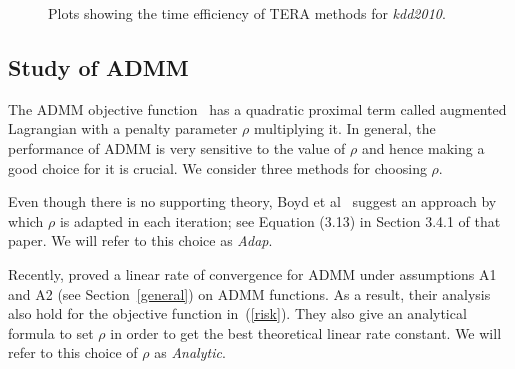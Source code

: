 \documentclass[twoside, 11pt]{article}
\begin{document}
\begin{figure}[t]
\centering
{}
\caption{Plots showing the time efficiency of TERA methods for {\it kdd2010}.}
\label{fig:tera}
\end{figure}


\subsection{Study of ADMM}
\label{subsec:admm}

The ADMM objective function~\citep{Boyd2011} has a quadratic proximal term called augmented Lagrangian with a penalty parameter $\rho$ multiplying it. In general, the performance of ADMM is very sensitive to the value of $\rho$ and hence making a good choice for it is crucial. We consider three methods for choosing $\rho$.

Even though there is no supporting theory, Boyd et al~\citep{Boyd2011} suggest an approach by which $\rho$ is adapted in each iteration; see Equation (3.13) in Section 3.4.1 of that paper. We will refer to this choice as {\it Adap}.

Recently, \citet{deng2012} proved a linear rate of convergence for ADMM under assumptions A1 and A2 (see Section~\ref{general}) on ADMM functions. As a result, their analysis also hold for the objective function in~(\ref{risk}). They also give an analytical formula to set $\rho$ in order to get the best theoretical linear rate constant. We will refer to this choice of $\rho$ as {\it Analytic}.
\end{document}
